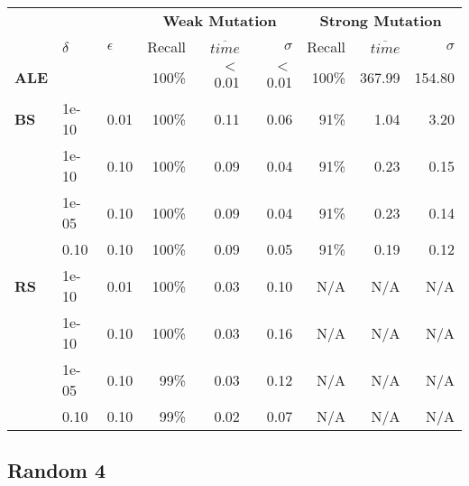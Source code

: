 \begin{small} 
\begin{tabular}{lll|r|r|r|r|r|r} 
 & & & \multicolumn{3}{c|}{\textbf{Weak Mutation}} & \multicolumn{3}{c}{\textbf{Strong Mutation}}\\ 
 & $\delta$ & $\epsilon$ & Recall & $\overline{time}$ & $\sigma$ & Recall & $\overline{time}$ & $\sigma$ \\  
\hline 
\textbf{ALE} & & & 100\% & $<$0.01  & $<$0.01  & 100\% & 367.99  & 154.80  \\ 
\textbf{BS}  & 1e-10  & 0.01  & 100\% & 0.11  & 0.06  & 91\% & 1.04  & 3.20\\
 & 1e-10  & 0.10  & 100\% & 0.09  & 0.04  & 91\% & 0.23  & 0.15\\
 & 1e-05  & 0.10  & 100\% & 0.09  & 0.04  & 91\% & 0.23  & 0.14\\
 & 0.10  & 0.10  & 100\% & 0.09  & 0.05  & 91\% & 0.19  & 0.12\\
\textbf{RS}  & 1e-10  & 0.01  & 100\% & 0.03  & 0.10 & N/A & N/A & N/A \\
 & 1e-10  & 0.10  & 100\% & 0.03  & 0.16 & N/A & N/A & N/A \\
 & 1e-05  & 0.10  & 99\% & 0.03  & 0.12 & N/A & N/A & N/A \\
 & 0.10  & 0.10  & 99\% & 0.02  & 0.07 & N/A & N/A & N/A \\
\end{tabular} 
\end{small}


\subsection{Random 4}

